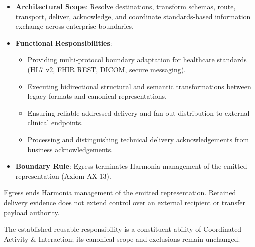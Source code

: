 
\begin{itemize}

\item
\textbf{Architectural Scope}: Resolve destinations, transform schemas, route, transport, deliver, acknowledge, and coordinate standards-based information exchange across enterprise boundaries.



\item
\textbf{Functional Responsibilities}:


\begin{itemize}

\item
Providing multi-protocol boundary adaptation for healthcare standards (HL7 v2, FHIR REST, DICOM, secure messaging).



\item
Executing bidirectional structural and semantic transformations between legacy formats and canonical representations.



\item
Ensuring reliable addressed delivery and fan-out distribution to external clinical endpoints.



\item
Processing and distinguishing technical delivery acknowledgements from business acknowledgements.



\end{itemize}


\item
\textbf{Boundary Rule}: Egress terminates Harmonia management of the emitted representation (Axiom AX-13).



\end{itemize}


Egress ends Harmonia management of the emitted representation. Retained delivery evidence does not extend control over an external recipient or transfer payload authority.



The established reusable responsibility is a constituent ability of Coordinated Activity \& Interaction; its canonical scope and exclusions remain unchanged.


